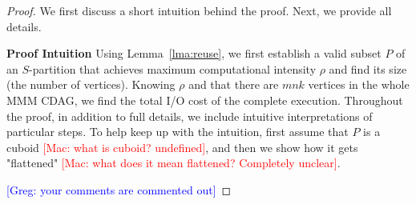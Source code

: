 \documentclass[sigplan,review,anonymous]{acmart}\settopmatter{printfolios=true,printccs=false,printacmref=false}
\newcommand\greg[1]{\textcolor{blue}{[Greg: #1]}}
\newcommand\mac[1]{\textcolor{red}{[Mac: #1]}}
\newcommand{\macb}[1]{\textbf{\textsf{#1}}}
\begin{document}
\begin{proof}

We first discuss a short intuition behind
the proof. Next, we provide all details.

\macb{Proof Intuition}
%
Using Lemma~\ref{lma:reuse}, we first establish a valid subset $P$ of an
$S$-partition that achieves maximum computational intensity $\rho$ and find its
size (the number of vertices). Knowing $\rho$ and that there are $mnk$
vertices in the whole MMM CDAG, we find the total
I/O cost of the complete execution. Throughout the proof, in addition to
full details, we include intuitive interpretations of particular steps. To
help keep up with the intuition, first assume that $P$ is a cuboid \mac{what is
cuboid? undefined}, and then we show how it gets "flattened" \mac{what does it
mean flattened? Completely unclear}.

\greg{your comments are commented out}
%  


\end{proof}
\end{document}
